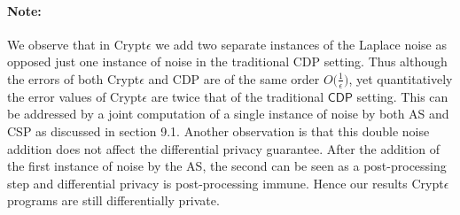 \paragraph{\textbf{Note:}} We observe that in Crypt$\epsilon$ we add two separate instances of the Laplace noise as opposed just one instance of noise in the traditional \textsf{CDP} setting. Thus although the errors of both Crypt$\epsilon$ and \textsf{CDP} are of the same order $O\big(\frac{1}{\epsilon}\big)$, yet quantitatively the error values of Crypt$\epsilon$ are twice that of the traditional $\textsf{CDP}$ setting. This can be addressed by a joint computation of a single instance of noise by both \textsf{AS} and \textsf{CSP} as discussed in section 9.1. Another observation is that this double noise addition does not affect the differential privacy guarantee. After the addition of the first instance of noise by the \textsf{AS}, the second can be seen as a post-processing step and differential privacy is post-processing immune. Hence our results Crypt$\epsilon$ programs are still differentially private.


